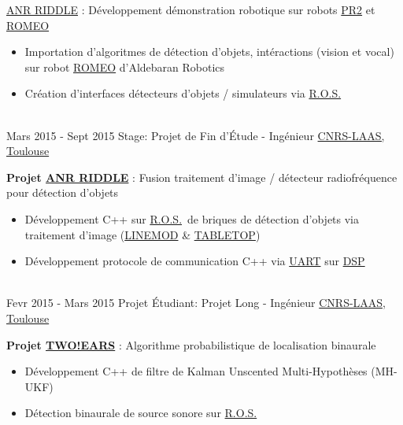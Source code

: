 \documentclass[letterpaper]{twentysecondcv} %
\newcommand{\ros}{\href{http://www.ros.org/}{R.O.S.}}
\begin{document}
\begin{twenty}
{{      \href{http://www.agence-nationale-recherche.fr/Project-ANR-12-CORD-0003}{ANR
        RIDDLE}} : Développement démonstration robotique sur robots \href{http://www.willowgarage.com/pages/pr2/overview}{PR2} et \href{https://spectrum.ieee.org/automaton/robotics/humanoids/aldebaran-robotics-introduces-romeo-finally}{ROMEO}
    \begin{itemize}
    \item Importation d'algoritmes de détection d'objets, intéractions (vision
      et vocal) sur robot
      \href{https://spectrum.ieee.org/automaton/robotics/humanoids/aldebaran-robotics-introduces-romeo-finally}{ROMEO}
      d'Aldebaran Robotics
    \item Création d'interfaces détecteurs d'objets / simulateurs via \ros
    \end{itemize}
  }
  \\
  \twentyitem
  {Mars 2015 -}
  {Sept 2015}
  {Stage: Projet de Fin d'Étude - Ingénieur}
  {\href{https://www.laas.fr/public/fr}{CNRS-LAAS, Toulouse}}
  {
    \textbf{Projet
      \href{http://www.agence-nationale-recherche.fr/Project-ANR-12-CORD-0003}{ANR
        RIDDLE}} : Fusion traitement d'image / détecteur radiofréquence pour
    détection d'objets
    \begin{itemize}
    \item Développement C++ sur \ros\ de briques de
      détection d'objets via traitement d'image
      (\href{http://www.stefan-hinterstoisser.com/papers/hinterstoisser2011linemod.pdf}{LINEMOD}
      \& \href{http://wiki.ros.org/tabletop_object_detector}{TABLETOP})
    \item Développement protocole de communication C++ via
      \href{https://en.wikipedia.org/wiki/Universal_asynchronous_receiver-transmitter}{UART}
      sur \href{https://en.wikipedia.org/wiki/Digital_signal_processor}{DSP}
    \end{itemize}
  }
  \\
  \twentyitem
  {Fevr 2015 -}
  {Mars 2015}
  {Projet Étudiant: Projet Long - Ingénieur}
  {\href{https://www.laas.fr/public/fr}{CNRS-LAAS, Toulouse}}
  {
    \textbf{Projet
      \href{http://twoears.eu/}{TWO!EARS}} : Algorithme probabilistique de
    localisation binaurale
    \begin{itemize}
    \item Développement C++ de filtre de Kalman Unscented Multi-Hypothèses
      (MH-UKF)
    \item Détection binaurale de source sonore sur \ros
    \end{itemize}
}
\end{twenty}
\end{document}
